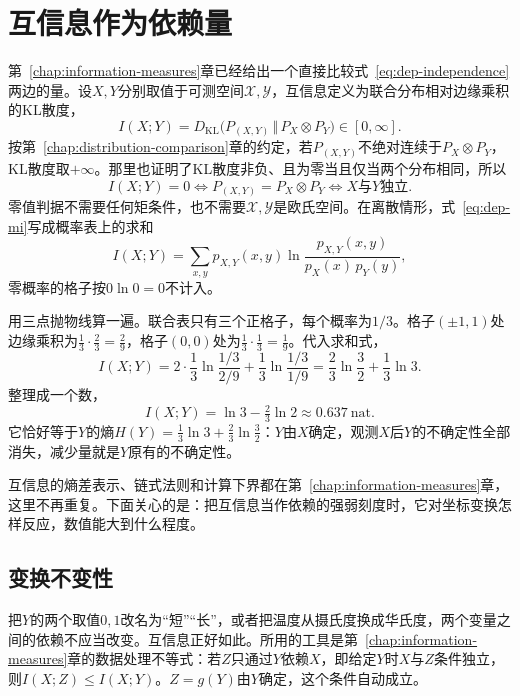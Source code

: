 \section{互信息作为依赖量}
\label{sec:dep-mutual-information}

第~\ref{chap:information-measures}章已经给出一个直接比较式~\eqref{eq:dep-independence}两边的量。设$X,Y$分别取值于可测空间$\mathcal{X},\mathcal{Y}$，互信息定义为联合分布相对边缘乘积的KL散度，
\begin{equation}
  I(X;Y)=D_{\mathrm{KL}}\bigl(P_{(X,Y)}\,\Vert\,P_X\otimes P_Y\bigr)\in[0,\infty].
  \label{eq:dep-mi}
\end{equation}
按第~\ref{chap:distribution-comparison}章的约定，若$P_{(X,Y)}$不绝对连续于$P_X\otimes P_Y$，KL散度取$+\infty$。那里也证明了KL散度非负、且为零当且仅当两个分布相同，所以
\[
  I(X;Y)=0\iff P_{(X,Y)}=P_X\otimes P_Y\iff X\text{与}Y\text{独立}.
\]
零值判据不需要任何矩条件，也不需要$\mathcal{X},\mathcal{Y}$是欧氏空间。在离散情形，式~\eqref{eq:dep-mi}写成概率表上的求和
\[
  I(X;Y)=\sum_{x,y}p_{X,Y}(x,y)\ln\frac{p_{X,Y}(x,y)}{p_X(x)\,p_Y(y)},
\]
零概率的格子按$0\ln0=0$不计入。

用三点抛物线算一遍。联合表只有三个正格子，每个概率为$1/3$。格子$(\pm1,1)$处边缘乘积为$\frac13\cdot\frac23=\frac29$，格子$(0,0)$处为$\frac13\cdot\frac13=\frac19$。代入求和式，
\[
  I(X;Y)=2\cdot\frac13\ln\frac{1/3}{2/9}+\frac13\ln\frac{1/3}{1/9}=\frac23\ln\frac32+\frac13\ln3 .
\]
整理成一个数，
\[
  I(X;Y)=\ln3-\tfrac23\ln2\approx0.637\ \text{nat}.
\]
它恰好等于$Y$的熵$H(Y)=\frac13\ln3+\frac23\ln\frac32$：$Y$由$X$确定，观测$X$后$Y$的不确定性全部消失，减少量就是$Y$原有的不确定性。

互信息的熵差表示、链式法则和计算下界都在第~\ref{chap:information-measures}章，这里不再重复。下面关心的是：把互信息当作依赖的强弱刻度时，它对坐标变换怎样反应，数值能大到什么程度。

\subsection{变换不变性}
\label{sec:dep-mi-invariance}

把$Y$的两个取值$0,1$改名为“短”“长”，或者把温度从摄氏度换成华氏度，两个变量之间的依赖不应当改变。互信息正好如此。所用的工具是第~\ref{chap:information-measures}章的数据处理不等式：若$Z$只通过$Y$依赖$X$，即给定$Y$时$X$与$Z$条件独立，则$I(X;Z)\leq I(X;Y)$。$Z=g(Y)$由$Y$确定，这个条件自动成立。

